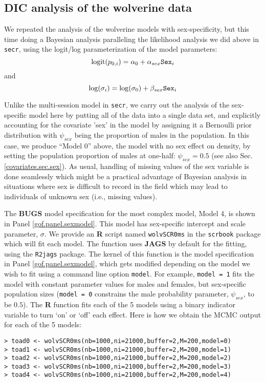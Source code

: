 \subsection{DIC analysis of the wolverine data}

We repeated the analysis of the wolverine models with sex-specificity,
but this time doing a Bayesian analysis paralleling the likelihood
analysis we did above in \mbox{\tt secr}, using the logit/log
parameterization of the model parameters:
\[
 \mbox{logit}(p_{0,i}) = \alpha_{0} + \alpha_{sex} \mbox{\tt Sex}_{i}
\]
and
\[
 \mbox{log}(\sigma_{i}) = \log(\sigma_{0}) + \beta_{sex} \mbox{\tt Sex}_{i}
\]

Unlike the multi-session model in \mbox{\tt secr}, we carry out the
analysis of the sex-specific model here by putting all of the data
into a single data set, and explicitly accounting for the covariate
'sex' in the model by assigning it a Bernoulli prior distribution with
$\psi_{sex}$ being the proportion of males in the population. In this
case, we produce ``Model 0'' above, the model with no sex effect on
density, by setting the population proportion of males at one-half: $\psi_{sex} = 0.5$
(see also Sec. \ref{covariates.sec.sex}).
As usual, handling of missing values
of the sex variable is done seamlessly which might be a practical
advantage of Bayesian analysis in situations where sex is difficult to
record in the field which may lead to individuals of unknown sex
(i.e., missing values).  

The {\bf BUGS} model specification for the
most complex model, Model 4, is shown in Panel
\ref{gof.panel.sexmodel}.  This model has sex-specific intercept and
scale parameter, $\sigma$.  We provide an {\bf R} script named
\mbox{\tt wolvSCR0ms} in the \mbox{\tt scrbook} package which will fit
each model.  The function uses {\bf JAGS} by default for the fitting,
using the \mbox{\tt R2jags} package.  The kernel of this function is
the model specification in Panel \ref{gof.panel.sexmodel}, which gets
modified depending on the model we wish to fit using a command line
option \mbox{\tt model}. For example, \mbox{\tt model = 1} fits the
model with constant parameter values for males and females, but
sex-specific population sizes (\mbox{\tt model = 0} constrains the
male probability parameter, $\psi_{sex}$, to be $0.5$).  The {\bf R} function
fits each of the 5 models using a binary indicator variable to turn
`on' or `off' each effect.  Here is how we obtain the MCMC output for
each of the 5 models: {\small
\begin{verbatim}
> toad0 <- wolvSCR0ms(nb=1000,ni=21000,buffer=2,M=200,model=0)
> toad1 <- wolvSCR0ms(nb=1000,ni=21000,buffer=2,M=200,model=1)
> toad2 <- wolvSCR0ms(nb=1000,ni=21000,buffer=2,M=200,model=2)
> toad3 <- wolvSCR0ms(nb=1000,ni=21000,buffer=2,M=200,model=3)
> toad4 <- wolvSCR0ms(nb=1000,ni=21000,buffer=2,M=200,model=4)
\end{verbatim}
}



